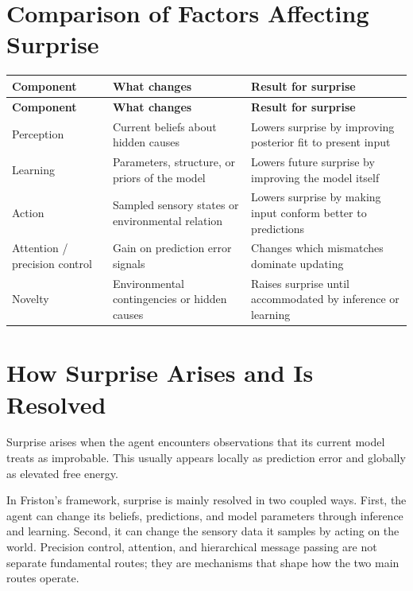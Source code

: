 \documentclass[a4paper,11pt]{article}
\begin{document}
    
    \section{Comparison of Factors Affecting Surprise}
        \begin{longtable}{>{\raggedright\arraybackslash}p{3.0cm} >{\raggedright\arraybackslash}p{5.0cm} >{\raggedright\arraybackslash}p{5.2cm}}
            \toprule
            \rowcolor{gray!15}
            \textbf{Component} & \textbf{What changes} & \textbf{Result for surprise} \\
            \midrule
            \endfirsthead
            \toprule
            \rowcolor{gray!15}
            \textbf{Component} & \textbf{What changes} & \textbf{Result for surprise} \\
            \midrule
            \endhead
            Perception & Current beliefs about hidden causes & Lowers surprise by improving posterior fit to present input \\
            Learning & Parameters, structure, or priors of the model & Lowers future surprise by improving the model itself \\
            Action & Sampled sensory states or environmental relation & Lowers surprise by making input conform better to predictions \\
            Attention / precision control & Gain on prediction error signals & Changes which mismatches dominate updating \\
            Novelty & Environmental contingencies or hidden causes & Raises surprise until accommodated by inference or learning \\
            \bottomrule
        \end{longtable}
    
    
    \section{How Surprise Arises and Is Resolved}
        Surprise arises when the agent encounters observations that its current model treats as improbable. This usually appears locally as prediction error and globally as elevated free energy.
        
        In Friston's framework, surprise is mainly resolved in two coupled ways. First, the agent can change its beliefs, predictions, and model parameters through inference and learning. Second, it can change the sensory data it samples by acting on the world. Precision control, attention, and hierarchical message passing are not separate fundamental routes; they are mechanisms that shape how the two main routes operate.
    
\end{document}
